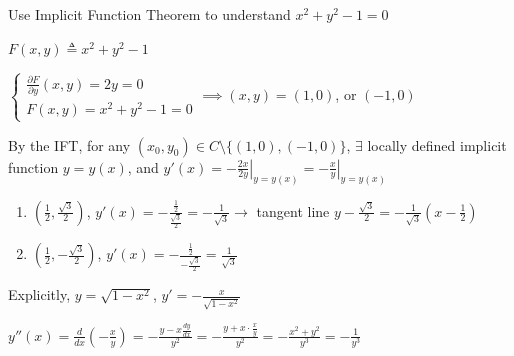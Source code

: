 \begin{example}
    Use Implicit Function Theorem to understand $x^2+y^2-1=0$

    $F(x,y)\triangleq x^2+y^2-1$

    $\begin{cases}
            \frac{\partial F}{\partial y}(x,y)=2y=0 \\
            F(x,y)=x^2+y^2-1=0
        \end{cases}\implies(x,y)=(1,0)$, or $(-1,0)$

    By the IFT, for any $(x_0,y_0)\in C\setminus\{(1,0),(-1,0)\}$, $\exists$ locally defined implicit function $y=y(x)$, and $y'(x)=-\left.\frac{2x}{2y}\right|_{y=y(x)}=-\left.\frac{x}{y}\right|_{y=y(x)}$

    \begin{enumerate}
        \item $\left(\frac{1}{2},\frac{\sqrt{3}}{2}\right)$, $y'(x)=-\frac{\frac{1}{2}}{\frac{\sqrt{3}}{2}}=-\frac{1}{\sqrt{3}}\rightarrow$ tangent line $y-\frac{\sqrt{3}}{2}=-\frac{1}{\sqrt{3}}\left(x-\frac{1}{2}\right)$
        \item $\left(\frac{1}{2},-\frac{\sqrt{3}}{2}\right)$, $y'(x)=-\frac{\frac{1}{2}}{-\frac{\sqrt{3}}{2}}=\frac{1}{\sqrt{3}}$
    \end{enumerate}
    Explicitly, $y=\sqrt{1-x^2}$, $y'=-\frac{x}{\sqrt{1-x^2}}$

    $y''(x)=\frac{d}{dx}(-\frac{x}{y})=-\frac{y-x\frac{dy}{dx}}{y^2}=-\frac{y+x\cdot\frac{x}{y}}{y^2}=-\frac{x^2+y^2}{y^3}=-\frac{1}{y^3}$
\end{example}

